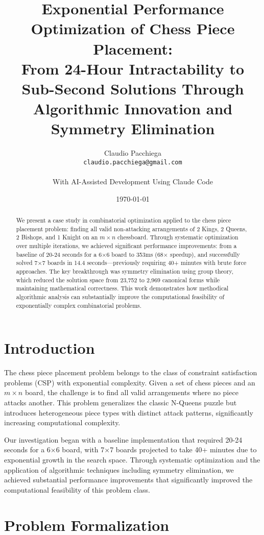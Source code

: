 \documentclass[12pt,a4paper]{article}
\title{Exponential Performance Optimization of Chess Piece Placement:\\
From 24-Hour Intractability to Sub-Second Solutions Through\\
Algorithmic Innovation and Symmetry Elimination}
\author{Claudio Pacchiega\\
\texttt{claudio.pacchiega@gmail.com}\\
\\
\small{With AI-Assisted Development Using Claude Code}}
\date{\today}
\theoremstyle{definition}
\begin{document}
\maketitle

\begin{abstract}
We present a case study in combinatorial optimization applied to the chess piece placement problem: finding all valid non-attacking arrangements of 2 Kings, 2 Queens, 2 Bishops, and 1 Knight on an $m \times n$ chessboard. Through systematic optimization over multiple iterations, we achieved significant performance improvements: from a baseline of 20-24 seconds for a 6$\times$6 board to 353ms (68$\times$ speedup), and successfully solved 7$\times$7 boards in 14.4 seconds—previously requiring 40+ minutes with brute force approaches. The key breakthrough was symmetry elimination using group theory, which reduced the solution space from 23,752 to 2,969 canonical forms while maintaining mathematical correctness. This work demonstrates how methodical algorithmic analysis can substantially improve the computational feasibility of exponentially complex combinatorial problems.
\end{abstract}

\section{Introduction}

The chess piece placement problem belongs to the class of constraint satisfaction problems (CSP) with exponential complexity. Given a set of chess pieces and an $m \times n$ board, the challenge is to find all valid arrangements where no piece attacks another. This problem generalizes the classic N-Queens puzzle but introduces heterogeneous piece types with distinct attack patterns, significantly increasing computational complexity.

Our investigation began with a baseline implementation that required 20-24 seconds for a 6$\times$6 board, with 7$\times$7 boards projected to take 40+ minutes due to exponential growth in the search space. Through systematic optimization and the application of algorithmic techniques including symmetry elimination, we achieved substantial performance improvements that significantly improved the computational feasibility of this problem class.

\section{Problem Formalization}
\end{document}
